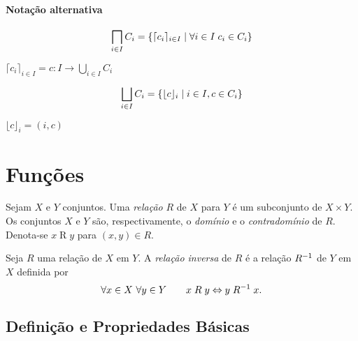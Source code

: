 

\subsubsection*{Notação alternativa}

\begin{equation*}
\prod_{i \in I} C_i = \set{\lceil c_i \rceil_{i \in I}}{\forall i \in I \; c_i \in C_i}
\end{equation*}

$\lceil c_i \rceil_{i \in I} = c: I \to \bigcup_{i \in I} C_i$

\begin{equation*}
\bigsqcup_{i \in I} C_i = \left\{\lfloor c \rfloor_i \;\middle\vert\; i \in I, c \in C_i \right\}
\end{equation*}

$\lfloor c \rfloor_i = (i,c)$

\chapter{Funções}

\begin{defi}
Sejam $X$ e $Y$ conjuntos. Uma \emph{relação} $R$ de $X$ para $Y$ é um subconjunto de $X \times Y$. Os conjuntos $X$ e $Y$ são, respectivamente, o \emph{domínio} e o \emph{contradomínio} de $R$. Denota-se $x \mathrel{R} y$ para $(x,y) \in R$.
\end{defi}

\begin{defi}
Seja $R$ uma relação de $X$ em $Y$. A \emph{relação inversa} de $R$ é a relação $R^{-1}$ de $Y$ em $X$ definida por
	\begin{equation*}
	\forall x \in X\ \forall y \in Y \qquad x \mathrel{R} y \Leftrightarrow y \mathrel{R^{-1}} x.
	\end{equation*}
\end{defi}


\section{Definição e Propriedades Básicas}

